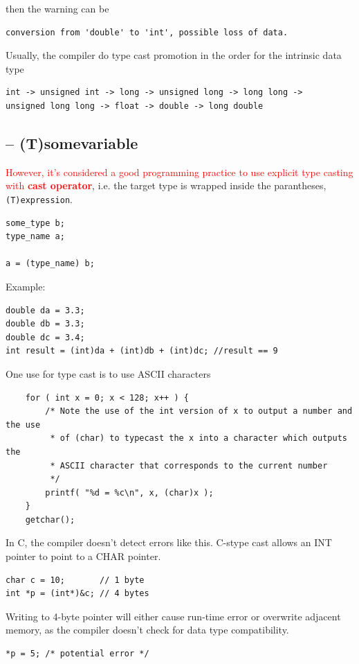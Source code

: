 then the warning can be
\begin{verbatim}
conversion from 'double' to 'int', possible loss of data.
\end{verbatim}

Usually, the compiler do type cast promotion in the order for the intrinsic data
type
\begin{verbatim}
int -> unsigned int -> long -> unsigned long -> long long -> 
unsigned long long -> float -> double -> long double
\end{verbatim}

\subsection{--   (T)somevariable}

\textcolor{red}{However, it's considered a good programming practice to use
explicit type casting with {\bf cast operator}}, i.e.
the target type is wrapped inside the parantheses, \verb!(T)expression!.
\begin{verbatim}
some_type b;
type_name a;

a = (type_name) b;
\end{verbatim}


Example:
\begin{verbatim}
double da = 3.3;
double db = 3.3;
double dc = 3.4;
int result = (int)da + (int)db + (int)dc; //result == 9
\end{verbatim} 

One use for type cast is to use ASCII characters
\begin{verbatim}
    for ( int x = 0; x < 128; x++ ) {
        /* Note the use of the int version of x to output a number and the use
         * of (char) to typecast the x into a character which outputs the
         * ASCII character that corresponds to the current number
         */
        printf( "%d = %c\n", x, (char)x );
    }
    getchar();
\end{verbatim}

In C, the compiler doesn't detect errors like this. C-stype cast allows an INT
pointer to point to a CHAR pointer.
\begin{verbatim}
char c = 10;       // 1 byte
int *p = (int*)&c; // 4 bytes
\end{verbatim}

Writing to 4-byte pointer will either cause run-time error or overwrite adjacent
memory, as the compiler doesn't check for data type compatibility. 
\begin{verbatim}
*p = 5; /* potential error */
\end{verbatim}


